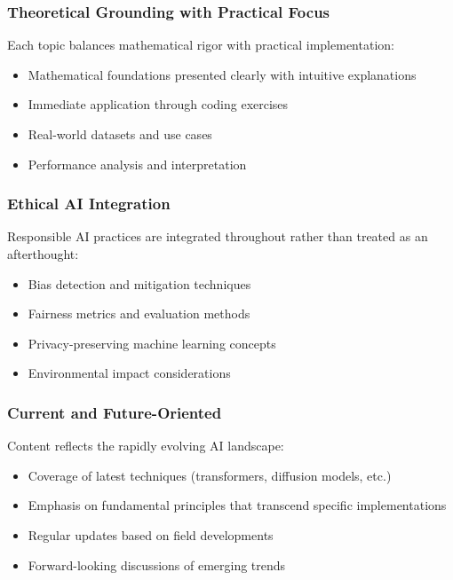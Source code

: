 \subsubsection{Theoretical Grounding with Practical Focus}

Each topic balances mathematical rigor with practical implementation:
\begin{itemize}
    \item Mathematical foundations presented clearly with intuitive explanations
    \item Immediate application through coding exercises
    \item Real-world datasets and use cases
    \item Performance analysis and interpretation
\end{itemize}

\subsubsection{Ethical AI Integration}

Responsible AI practices are integrated throughout rather than treated as an afterthought:
\begin{itemize}
    \item Bias detection and mitigation techniques
    \item Fairness metrics and evaluation methods
    \item Privacy-preserving machine learning concepts
    \item Environmental impact considerations
\end{itemize}

\subsubsection{Current and Future-Oriented}

Content reflects the rapidly evolving AI landscape:
\begin{itemize}
    \item Coverage of latest techniques (transformers, diffusion models, etc.)
    \item Emphasis on fundamental principles that transcend specific implementations
    \item Regular updates based on field developments
    \item Forward-looking discussions of emerging trends
\end{itemize}

